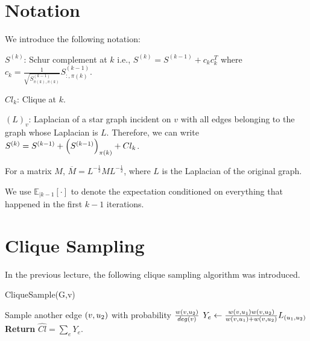 \documentclass[11pt]{article}
\newenvironment{tight_itemize}{
\begin{itemize}
 \setlength{\itemsep}{2pt}
 \setlength{\parskip}{1pt}
}{\end{itemize}}
\begin{document}
\newcommand{\coursenum}{{CSC 2421H}}
\newcommand{\coursename}{{Graphs, Matrices, and Optimization}}
\newcommand{\courseprof}{Sushant Sachdeva}


\section{Notation}
We introduce the following notation:
\begin{tight_itemize}
	\item $ S^{(k)} $: Schur complement at $ k $ i.e., $ S^{(k)}  = S^{(k-1)} + c_{k}c_{k}^{T} $ 
	where $ c_{k} = \frac{1}{\sqrt{S^{(k-1)}_{\pi(k),\pi(k)}}}S^{(k-1)}_{:,\pi(k)} $.
	\item $ Cl_{k} $: Clique at $ k $.
	\item $ (L)_{v} $: Laplacian of a star graph incident on $ v $ with all edges belonging to the graph whose Laplacian is $ L $. Therefore, we can write $ S^{(k)} = S^{(k-1)} + \paren{S^{(k-1)}}_{\pi(k)} + Cl_{k} $.
	\item For a matrix $ M $, $ \overline{M} = L^{-\frac{1}{2}}ML^{-\frac{1}{2} }$, where $ L $ is the Laplacian of the original graph.
	\item We use $ \mathbb{E}_{|k-1}[\cdot] $ to denote the expectation conditioned on everything that happened in the first $ k-1 $ iterations. 
\end{tight_itemize}


\section{Clique Sampling}
In the previous lecture, the following clique sampling algorithm was introduced.

\begin{algorithm}
	\caption{CliqueSample(G,v)}\label{alg:clq_smpl}
	\begin{algorithmic}[1]
			\State Sample another edge $ \paren{v,u_{2}} $ with probability $ \frac{w\paren{v,u_{2}}}{deg\paren{v}} $ 
				\State $ Y_{e} \gets \frac{w\paren{v,u_{1}}w\paren{v,u_{2}}}{w\paren{v,u_{1}} + w\paren{v,u_{2}}}L_{\paren{u_{1},u_{2}}} $
			\EndIf
		\EndFor
		\State \textbf{Return} $\widehat{Cl} = \sum_{e}Y_{e} $.
	\end{algorithmic}
\end{algorithm}
\end{document}
